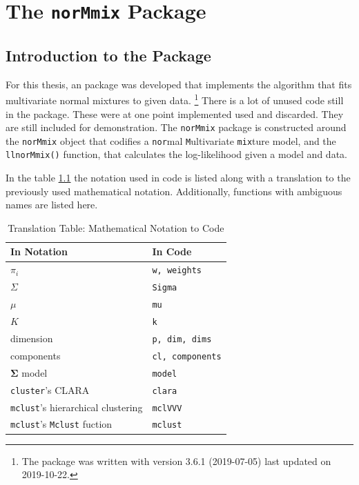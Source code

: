 \chapter{The {\tt norMmix} Package}





\section{Introduction to the Package}

For this thesis, an \Rp package was developed that implements the algorithm
that fits multivariate normal mixtures to given data.
\footnote{The package was written with \Rp version 3.6.1 (2019-07-05) last 
updated on 2019-10-22.}
There is a lot of unused code still in the package. These were at one point
implemented used and discarded. They are still included for demonstration.
The {\tt norMmix} package is constructed around the {\tt norMmix} object that 
codifies a {\tt nor}mal {\tt M}ultivariate {\tt mix}ture model,  and the {\tt 
llnorMmix()} function, that calculates the log-likelihood given a model and 
data.


In the table \ref{tab:code-notation} the notation used in code is listed
along with a translation to the previously used mathematical notation.
Additionally, functions with ambiguous names are listed here.

\begin{table}
    \centering
    \begin{tabular}{l l}
        \hline
        In Notation & In Code \\
        \hline
        $\pi_i$     & {\tt w, weights} \\
        $\Sigma$    & {\tt Sigma} \\
        $\mu$       & {\tt mu} \\
        $K$         & {\tt k} \\
        dimension   & {\tt p, dim, dims} \\
        components  & {\tt cl, components} \\
        $\pmb{\Sigma}$ model & {\tt model} \\
        {\tt cluster}'s CLARA & {\tt clara} \\
        {\tt mclust}'s hierarchical clustering & {\tt mclVVV} \\
        {\tt mclust}'s {\tt Mclust} fuction & {\tt mclust} \\
        \hline
    \end{tabular}
    \caption{Translation Table: Mathematical Notation to \Rp Code}
    \label{tab:code-notation}
\end{table}


